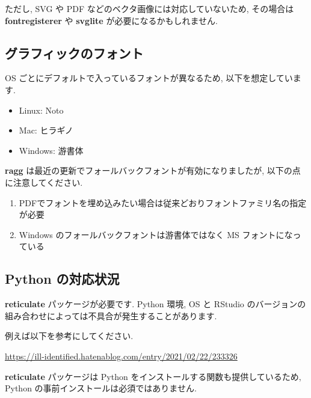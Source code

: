 \documentclass[
]{ltjsarticle}
\providecommand{\tightlist}{%
  \setlength{\itemsep}{0pt}\setlength{\parskip}{0pt}}
\newenvironment{infobox}[1]{\begin{itemize}\renewcommand{\labelitemi}{\raisebox{-.7\height}[0pt][0pt]{%
  {\setkeys{Gin}{width=3em,keepaspectratio}\texttt{[image: \_latex/\_img/\#1]}}}}
  \setlength{\fboxsep}{1em}
  \begin{greyblock}
  \item
  }{\end{greyblock}\end{itemize}
}
\begin{document}
ただし, SVG や PDF などのベクタ画像には対応していないため, その場合は \textbf{fontregisterer} や \textbf{svglite} が必要になるかもしれません.

\hypertarget{ux30b0ux30e9ux30d5ux30a3ux30c3ux30afux306eux30d5ux30a9ux30f3ux30c8}{%
\subsection{グラフィックのフォント}\label{ux30b0ux30e9ux30d5ux30a3ux30c3ux30afux306eux30d5ux30a9ux30f3ux30c8}}

OS ごとにデフォルトで入っているフォントが異なるため, 以下を想定しています.

\begin{itemize}
\tightlist
\item
  Linux: Noto
\item
  Mac: ヒラギノ
\item
  Windows: 游書体
\end{itemize}

\textbf{ragg} は最近の更新でフォールバックフォントが有効になりましたが, 以下の点に注意してください.

\begin{enumerate}
\def\labelenumi{\arabic{enumi}.}
\tightlist
\item
  PDFでフォントを埋め込みたい場合は従来どおりフォントファミリ名の指定が必要
\item
  Windows のフォールバックフォントは游書体ではなく MS フォントになっている
\end{enumerate}

\hypertarget{python-ux306eux5bfeux5fdcux72b6ux6cc1}{%
\subsection{Python の対応状況}\label{python-ux306eux5bfeux5fdcux72b6ux6cc1}}

\textbf{reticulate} パッケージが必要です. Python 環境, OS と RStudio のバージョンの組み合わせによっては不具合が発生することがあります.

例えば以下を参考にしてください.

\url{https://ill-identified.hatenablog.com/entry/2021/02/22/233326}

\begin{infobox}{important}
\textbf{reticulate} パッケージは Python をインストールする関数も提供しているため, Python の事前インストールは必須ではありません.

\end{infobox}
\end{document}
